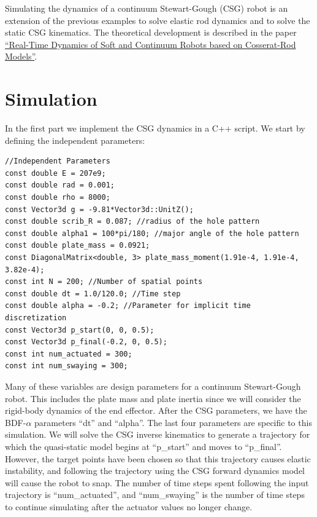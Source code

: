 \documentclass[12pt]{article}
\begin{document}
\makeatletter
\renewcommand{\@maketitle}{
\newpage
\null
\vskip 2em
\begin{center}
{\LARGE \@title \par}
\end{center}
\par
} \makeatother

\maketitle

Simulating the dynamics of a continuum Stewart-Gough (CSG) robot is an extension of the previous examples to solve elastic rod dynamics and to solve the static CSG kinematics. The theoretical development is described in the paper \href{https://journals.sagepub.com/doi/10.1177/0278364919842269}{``Real-Time Dynamics of Soft and Continuum Robots based on Cosserat-Rod Models''}.

\section{Simulation}

In the first part we implement the CSG dynamics in a C++ script. We start by defining the independent parameters:
\begin{lstlisting}
//Independent Parameters
const double E = 207e9;
const double rad = 0.001;
const double rho = 8000;
const Vector3d g = -9.81*Vector3d::UnitZ();
const double scrib_R = 0.087; //radius of the hole pattern
const double alpha1 = 100*pi/180; //major angle of the hole pattern
const double plate_mass = 0.0921;
const DiagonalMatrix<double, 3> plate_mass_moment(1.91e-4, 1.91e-4, 3.82e-4);
const int N = 200; //Number of spatial points
const double dt = 1.0/120.0; //Time step
const double alpha = -0.2; //Parameter for implicit time discretization
const Vector3d p_start(0, 0, 0.5);
const Vector3d p_final(-0.2, 0, 0.5);
const int num_actuated = 300;
const int num_swaying = 300;
\end{lstlisting}
Many of these variables are design parameters for a continuum Stewart-Gough robot. This includes the plate mass and plate inertia since we will consider the rigid-body dynamics of the end effector. After the CSG parameters, we have the BDF-$\alpha$ parameters ``dt'' and ``alpha''. The last four parameters are specific to this simulation. We will solve the CSG inverse kinematics to generate a trajectory for which the quasi-static model begins at ``p\_start'' and moves to ``p\_final''. However, the target points have been chosen so that this trajectory causes elastic instability, and following the trajectory using the CSG forward dynamics model will cause the robot to snap. The number of time steps spent following the input trajectory is ``num\_actuated'', and ``num\_swaying'' is the number of time steps to continue simulating after the actuator values no longer change.
\end{document}
